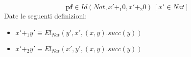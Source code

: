\begin{displaymath}
    \textbf{pf} \in Id(Nat, x' +_1 0, x' +_2 0)\ [x' \in Nat]
\end{displaymath}
Date le seguenti definizioni:
\begin{itemize}
    \item $x' +_1 y' \equiv El_{Nat} (y', x', (x, y).succ(y))$
    \item $x' +_2 y' \equiv El_{Nat} (x', y', (x, y).succ(y))$
\end{itemize}